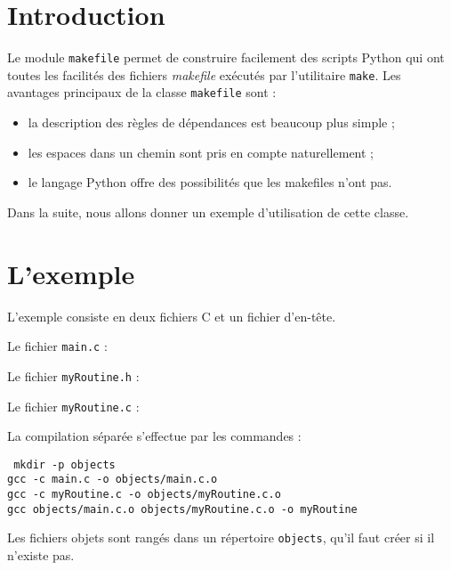 \documentclass[a4paper,11pt]{extarticle}
\begin{document}

\section{Introduction}

Le module \texttt{makefile} permet de construire facilement des scripts Python qui ont toutes les facilités des fichiers \emph{makefile} exécutés par l'utilitaire \texttt{make}. Les avantages principaux de la classe \texttt{makefile} sont :
\begin{itemize}
  \item la description des règles de dépendances est beaucoup plus simple ;
  \item les espaces dans un chemin sont pris en compte naturellement ; 
  \item le langage Python offre des possibilités que les makefiles n'ont pas.
\end{itemize}

Dans la suite, nous allons donner un exemple d'utilisation de cette classe.

\section{L'exemple}

L'exemple consiste en deux fichiers C et un fichier d'en-tête.

Le fichier \texttt{main.c} :



Le fichier \texttt{myRoutine.h} :



Le fichier \texttt{myRoutine.c} :


La compilation séparée s'effectue par les commandes :

\begin{mdframed}[hidealllines=true,backgroundcolor=lightgray!20]
\tt\footnotesize
mkdir -p objects\\
gcc -c main.c -o objects/main.c.o\\
gcc -c myRoutine.c -o objects/myRoutine.c.o\\
gcc objects/main.c.o objects/myRoutine.c.o -o myRoutine
\end{mdframed}


Les fichiers objets sont rangés dans un répertoire \texttt{objects}, qu'il faut créer si il n'existe pas.
\end{document}

